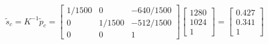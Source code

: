 \documentclass[12pt, letterpaper]{article}
\begin{document}
\begin{enumerate}
        \begin{equation*}
            \tilde{s}_c=K^{-1}\tilde{p}_c=\begin{bmatrix}
                1/1500 & 0 & -640/1500\\
                0 & 1/1500 & -512/1500\\
                0 & 0 & 1
            \end{bmatrix}
            \begin{bmatrix}
                1280\\
                1024\\
                1
            \end{bmatrix}=\begin{bmatrix}
                0.427\\
                0.341\\
                1
            \end{bmatrix}
        \end{equation*}


\end{enumerate}
\end{document}
